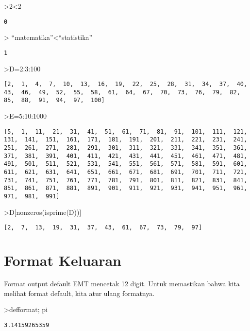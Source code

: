 \documentclass[
]{book}
\begin{document}
\textgreater2\textless2

\begin{verbatim}
0
\end{verbatim}

\textgreater{} ``matematika''\textless{}``statistika''

\begin{verbatim}
1
\end{verbatim}

\textgreater D=2:3:100

\begin{verbatim}
[2,  1,  4,  7,  10,  13,  16,  19,  22,  25,  28,  31,  34,  37,  40,
43,  46,  49,  52,  55,  58,  61,  64,  67,  70,  73,  76,  79,  82,
85,  88,  91,  94,  97,  100]
\end{verbatim}

\textgreater E=5:10:1000

\begin{verbatim}
[5,  1,  11,  21,  31,  41,  51,  61,  71,  81,  91,  101,  111,  121,
131,  141,  151,  161,  171,  181,  191,  201,  211,  221,  231,  241,
251,  261,  271,  281,  291,  301,  311,  321,  331,  341,  351,  361,
371,  381,  391,  401,  411,  421,  431,  441,  451,  461,  471,  481,
491,  501,  511,  521,  531,  541,  551,  561,  571,  581,  591,  601,
611,  621,  631,  641,  651,  661,  671,  681,  691,  701,  711,  721,
731,  741,  751,  761,  771,  781,  791,  801,  811,  821,  831,  841,
851,  861,  871,  881,  891,  901,  911,  921,  931,  941,  951,  961,
971,  981,  991]
\end{verbatim}

\textgreater D{[}nonzeros(isprime(D)){]}

\begin{verbatim}
[2,  7,  13,  19,  31,  37,  43,  61,  67,  73,  79,  97]
\end{verbatim}

\section{Format Keluaran}\label{format-keluaran}

Format output default EMT mencetak 12 digit. Untuk memastikan bahwa kita melihat format default, kita atur ulang formatnya.

\textgreater defformat; pi

\begin{verbatim}
3.14159265359
\end{verbatim}
\end{document}
